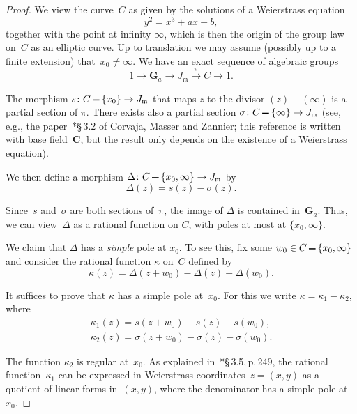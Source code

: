 \documentclass[12pt]{amsart}
\numberwithin{equation}{section}
\def\setminus{\mathchoice
    {\mathbin{\vrule height .62ex width 1.61ex depth -.38ex}}%
    {\mathbin{\vrule height .62ex width 1.61ex depth -.38ex}}%
    {\mathbin{\vrule height .50ex width 0.85ex depth -.28ex}}%
    {\mathbin{\vrule height .20ex width 0.570ex depth -.24ex}}%
}
\newcommand{\Cc}{\mathbf{C}}
\newcommand{\Gg}{\mathbf{G}}
\newcommand{\mfm}{\mathfrak{m}}
\newcommand{\lra}{\longrightarrow}
\newcommand{\fleche}[1]{\stackrel{#1}{\lra}}
\theoremstyle{plain}
\theoremstyle{remark}
\theoremstyle{definition}
\begin{document}
\begin{proof}
  We view the curve~$C$ as given by the solutions of a Weierstrass
  equation
  \[
    y^2=x^3+ax+b,
  \]
  together with the point at infinity $\infty$, which is then
  the origin of the group law on~$C$ as an elliptic curve.  Up to translation we may
  assume (possibly up to a finite extension)  that~$x_0\not=\infty$. We have an exact sequence of algebraic groups
  \[
    1\to \Gg_a \to J_{\mfm}\fleche{\pi} C\to 1. 
  \]
    
  The morphism $s\colon C\setminus \{x_0\}\to J_{\mfm}$ that maps $z$
  to the divisor $(z)-(\infty)$ is a partial section of $\pi$. There exists also a partial section
  $\sigma\colon C\setminus \{\infty\} \to J_{\mfm}$ (see, e.g., the
  paper~\cite{cmz}*{\S\,3.2} of Corvaja, Masser and Zannier; this
  reference is written with base field~$\Cc$, but the result only
  depends on the existence of a Weierstrass equation).

  We then define a morphism
  $\Delta\colon C\setminus \{x_0,\infty\}\to J_{\mfm}$ by
  \[
    \Delta(z)=  s(z)-\sigma(z).
  \]

  Since~$s$ and~$\sigma$ are both sections of~$\pi$, the image of
  $\Delta$ is contained in~$\Gg_a$. Thus, we can view~$\Delta$ as a rational function on $C$, with poles at most at $\{x_0,\infty\}$.

  We claim that $\Delta$ has a \emph{simple} pole at $x_0$.  To see
  this, fix some $w_0\in C\setminus \{x_0,\infty\}$ and consider
  the rational function $\kappa$ on~$C$ defined by
  \[
    \kappa(z)=\Delta(z+w_0)-\Delta(z)-\Delta(w_0).
  \]

  It suffices to prove that $\kappa$ has a simple pole
  at~$x_0$. For this we write $\kappa=\kappa_1-\kappa_2$, where
  \begin{gather*}
    \kappa_1(z)=s(z+w_0)-s(z)-s(w_0),\\
    \kappa_2(z)=\sigma(z+w_0)-\sigma(z)-\sigma(w_0).
  \end{gather*}

  The function $\kappa_2$ is regular at~$x_0$. As explained
  in~\cite{cmz}*{\S\,3.5,\,p.\,249}, the rational function~$\kappa_1$
  can be expressed in Weierstrass coordinates~$z=(x,y)$ as a quotient of
  linear forms in~$(x,y)$, where the denominator has a simple pole
  at~$x_0$.


\end{proof}
\end{document}
